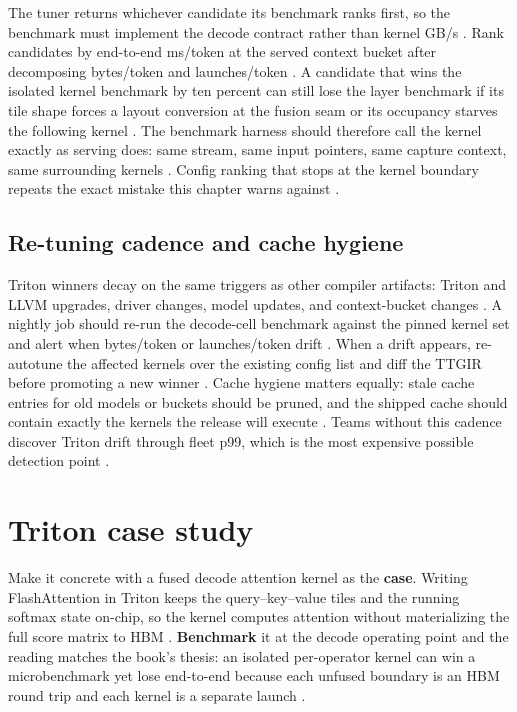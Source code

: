 The tuner returns whichever candidate its benchmark ranks first, so the benchmark must implement the decode contract rather than kernel GB/s \citep{patel2025llminference,memoryfloor2026}. Rank candidates by end-to-end ms/token at the served context bucket after decomposing bytes/token and launches/token \citep{taxbreak2026,dao2022flashattention}. A candidate that wins the isolated kernel benchmark by ten percent can still lose the layer benchmark if its tile shape forces a layout conversion at the fusion seam or its occupancy starves the following kernel \citep{tritonlang2024,memoryfloor2026}. The benchmark harness should therefore call the kernel exactly as serving does: same stream, same input pointers, same capture context, same surrounding kernels \citep{nvidia2024cudagraphs,patel2025llminference}. Config ranking that stops at the kernel boundary repeats the exact mistake this chapter warns against \citep{taxbreak2026,memoryfloor2026}.

\subsection{Re-tuning cadence and cache hygiene}

Triton winners decay on the same triggers as other compiler artifacts: Triton and LLVM upgrades, driver changes, model updates, and context-bucket changes \citep{tritonlang2024,memoryfloor2026,patel2025llminference}. A nightly job should re-run the decode-cell benchmark against the pinned kernel set and alert when bytes/token or launches/token drift \citep{taxbreak2026,chen2020compilerbasedhardw}. When a drift appears, re-autotune the affected kernels over the existing config list and diff the TTGIR before promoting a new winner \citep{tritonlang2024,memoryfloor2026}. Cache hygiene matters equally: stale cache entries for old models or buckets should be pruned, and the shipped cache should contain exactly the kernels the release will execute \citep{patel2025llminference,kwon2023vllm}. Teams without this cadence discover Triton drift through fleet p99, which is the most expensive possible detection point \citep{taxbreak2026,memoryfloor2026}.

\section{Triton case study}
\label{sec:ch17_triton_case_study}

Make it concrete with a fused decode attention kernel as the \textbf{case}. Writing FlashAttention in Triton keeps the query--key--value tiles and the running softmax state on-chip, so the kernel computes attention without materializing the full score matrix to HBM \citep{dao2022flashattention,tillet2019triton}. \textbf{Benchmark} it at the decode operating point and the reading matches the book's thesis: an isolated per-operator kernel can win a microbenchmark yet lose end-to-end because each unfused boundary is an HBM round trip and each kernel is a separate launch \citep{taxbreak2026,memoryfloor2026}.

